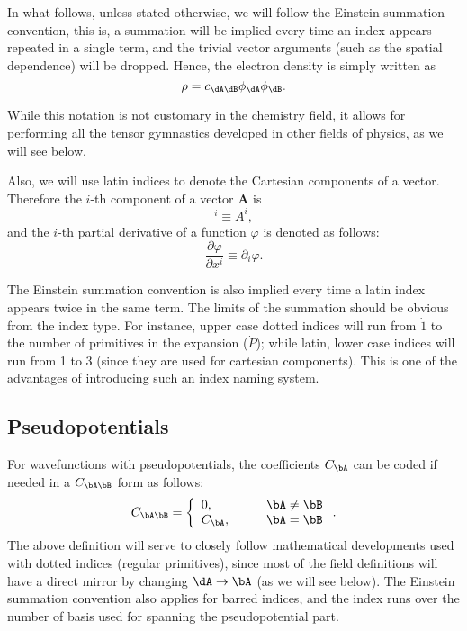 In what follows, unless stated otherwise, we will follow the Einstein summation convention, this is, a summation will be implied every time an index appears repeated in a single term, and the trivial vector arguments (such as the spatial dependence) will be dropped. Hence, the electron density is simply written as
%
\begin{equation}
   \rho=c_{\dA\dB}\phi_{\dA}\phi_{\dB}.
\end{equation}
%

While this notation is not customary in the chemistry field, it allows for performing all the tensor gymnastics developed in other fields of physics, as we will see below.

Also, we will use latin indices to denote the Cartesian components of a vector. Therefore the $i$-th component of a vector $\boldsymbol{A}$ is
%
\begin{equation}
   [\boldsymbol{A}]^{i}\equiv A^i,
\end{equation}
%
and the $i$-th partial derivative of a function $\varphi$ is denoted as follows:
%
\begin{equation}
   \frac{\partial\varphi}{\partial x^i}\equiv\partial_i\varphi.
\end{equation}
%

The Einstein summation convention is also implied every time a latin index appears twice in the
same term. The limits of the summation should be obvious from the index type. For
instance, upper case dotted indices will run from $\dot{1}$ to the number of primitives in
the expansion ($\dot{P}$); while latin, lower case indices will run from 1 to 3 (since they
are used for cartesian components). This is one of the advantages of introducing such an
index naming system.

\subsection{Pseudopotentials}

For wavefunctions with pseudopotentials, the coefficients $C_{\bA}$ can be coded if needed
in a $C_{\bA\bB}$ form as follows:
%
\begin{equation}%
  C_{\bA\bB}=\left\{
  \begin{array}{ll}
    0,&\qquad \bA\neq\bB\\
    C_{\bA},&\qquad\bA=\bB
  \end{array}
  \right..
\end{equation}
%
The above definition will serve to closely follow mathematical developments used with
dotted indices (regular primitives), since most of the field definitions will have
a direct mirror by changing $\dA\to\bA$ (as we will see below). The Einstein
summation convention also applies for barred indices, and the index runs over the
number of basis used for spanning the pseudopotential part.


